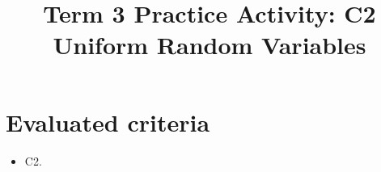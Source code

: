 \makeatletter
{}
\makeatother	


\usepackage{pgfplots}
\pgfplotsset{compat=1.18}

\title{Term 3 Practice Activity: C2 Uniform Random Variables}
\author{}
\date{}


	\maketitle

	\setcounter{tocdepth}{1}
	\setcounter{secnumdepth}{2}
	\tableofcontents

	\section*{Evaluated criteria}
	\begin{itemize}
		\item C2.
	\end{itemize}


\newcommand{\CtwoProbGraph}[7]{
	\begin{center}
		\begin{tikzpicture}
			\pgfmathsetmacro{\supportA}{#1}
			\pgfmathsetmacro{\supportB}{#2}
			\pgfmathsetmacro{\pad}{0.12*(\supportB-\supportA)}
			\begin{axis}[
			  width=9cm,
			  height=5cm,
			  axis lines=left,
			  xlabel={$x$},
			  ylabel={$f(x)$},
			  xmin={\supportA-\pad},
			  xmax={\supportB+\pad},
			  ymin=0,
			  ymax=#7,
			  grid=both,
			  xtick={#6}
				]
				\addplot[domain=#1:#2, samples=400, const plot, draw=none, fill=blue!20, fill opacity=0.35] {#3} \closedcycle;
				\addplot[domain=#4:#5, samples=400, const plot, draw=none, fill=blue!60, fill opacity=0.55] {#3} \closedcycle;
				\addplot[domain=#1:#2, samples=400, const plot, very thick] {#3};
			\end{axis}
		\end{tikzpicture}
	\end{center}
}

\newcommand{\UniformEndpointGraph}[9]{%
	\begin{center}
		\begin{tikzpicture}[x=#1cm,y=8cm]
			\draw[->] (#2,0) -- (#3,0) node[right] {$x$};
			\draw[->] (0,-0.01) -- (0,#4);
			
			\fill[blue!20, fill opacity=0.35] (0,0) rectangle (#5,#6);
			
			\fill[blue!60, fill opacity=0.55] (#7,0) rectangle (#8,#6);
			
			\draw[thick] (0,#6) -- (#5,#6);
			
			#9
		\end{tikzpicture}
	\end{center}
}

